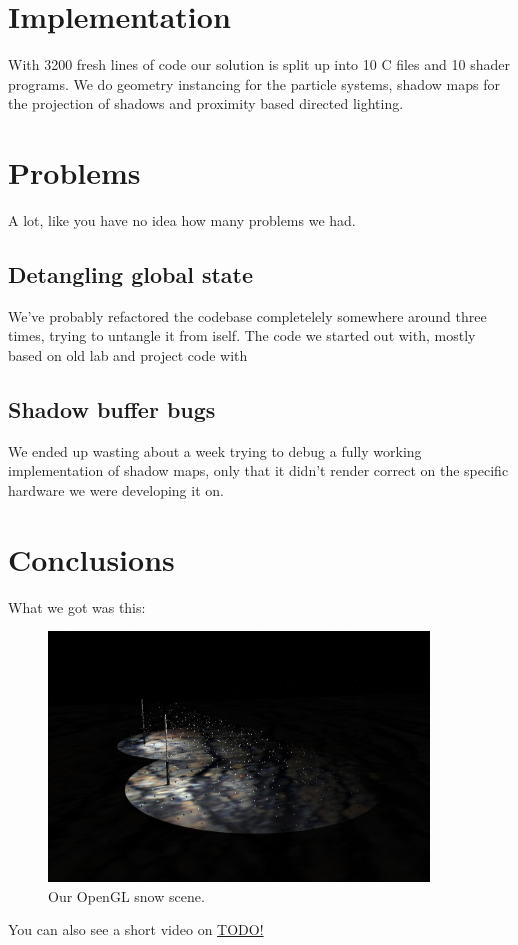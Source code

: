 \documentclass[a4paper,12pt]{article}
\begin{document}
\section{Implementation}

With 3200 fresh lines of code our solution is split up into 10 C files and 10 shader programs. We do geometry instancing for the particle systems, shadow maps for the projection of shadows and proximity based directed lighting.


\section{Problems}

A lot, like you have no idea how many problems we had.

\subsection{Detangling global state}

We've probably refactored the codebase completelely somewhere around three times, trying to untangle it from iself. The code we started out with, mostly based on old lab and project code with

\subsection{Shadow buffer bugs}

We ended up wasting about a week trying to debug a fully working implementation of shadow maps, only that it didn't render correct on the specific hardware we were developing it on.

\section{Conclusions}

What we got was this:

\begin{figure}[ht]
  \centering
  \includegraphics[width=0.9\textwidth]{result}
  \caption{\label{fig:label} Our OpenGL snow scene.}
\end{figure}

You can also see a short video on \href{YouTube}{TODO!}
\end{document}

